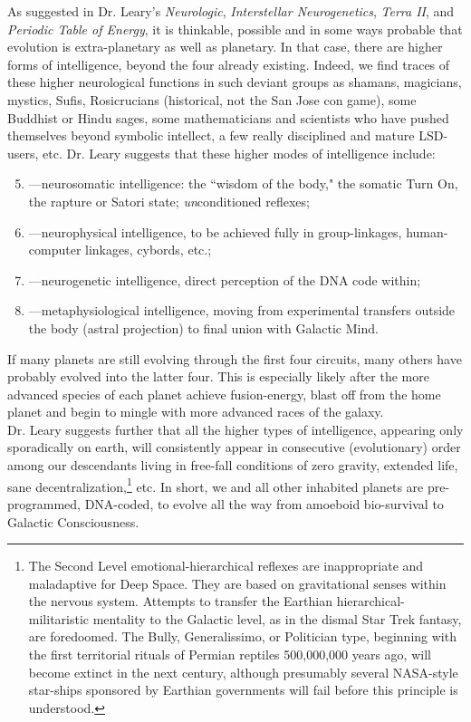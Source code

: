 \documentclass[12pt, onecolumn, letterpaper, oneside]{book}
\begin{document}
As suggested in Dr. Leary's \emph{Neurologic}, \emph{Interstellar Neurogenetics}, \emph{Terra II}, and \emph{Periodic Table of Energy}, it is thinkable, possible and in some ways probable that evolution is extra-planetary as well as planetary. In that case, there are higher forms of intelligence, beyond the four already existing. Indeed, we find traces of these higher neurological functions in such deviant groups as shamans, magicians, mystics, Sufis, Rosicrucians (historical, not the San Jose con game), some Buddhist or Hindu sages, some mathematicians and scientists who have pushed themselves beyond symbolic intellect, a few really disciplined and mature LSD-users, etc. Dr. Leary suggests that these higher modes of intelligence include:
\begin{enumerate}
\setcounter{enumi}{4}
\item ---neurosomatic intelligence: the ``wisdom of the body," the somatic Turn On, the rapture or Satori state; \emph{un}conditioned reflexes;
\item ---neurophysical intelligence, to be achieved fully in group-linkages, human-computer linkages, cybords, etc.;
\item ---neurogenetic intelligence, direct perception of the DNA code within;
\item ---metaphysiological intelligence, moving from experimental transfers outside the body (astral projection) to final union with Galactic Mind.
\end{enumerate}
If many planets are still evolving through the first four circuits, many others have probably evolved into the latter four. This is especially likely after the more advanced species of each planet achieve fusion-energy, blast off from the home planet and begin to mingle with more advanced races of the galaxy.\\
Dr. Leary suggests further that all the higher types of intelligence, appearing only sporadically on earth, will consistently appear in consecutive (evolutionary) order among our descendants living in free-fall conditions of zero gravity, extended life, sane decentralization,\footnote{The Second Level emotional-hierarchical reflexes are inappropriate and maladaptive for Deep Space. They are based on gravitational senses within the nervous system. Attempts to transfer the Earthian hierarchical-militaristic mentality to the Galactic level, as in the dismal Star Trek fantasy, are foredoomed. The Bully, Generalissimo, or Politician type, beginning with the first territorial rituals of Permian reptiles 500,000,000 years ago, will become extinct in the next century, although presumably several NASA-style star-ships sponsored by Earthian governments will fail before this principle is understood.} etc. In short, we and all other inhabited planets are pre-programmed, DNA-coded, to evolve all the way from amoeboid bio-survival to Galactic Consciousness.\\
\end{document}
